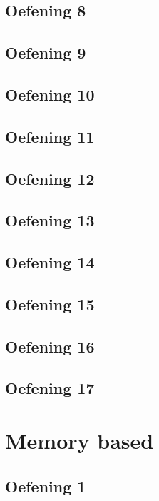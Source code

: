\documentclass[a4paper,11pt]{report}
\begin{document}
\section{Oefening 8}

\section{Oefening 9}

\section{Oefening 10}

\section{Oefening 11}

\section{Oefening 12}

\section{Oefening 13}

\section{Oefening 14}

\section{Oefening 15}

\section{Oefening 16}

\section{Oefening 17}


\newpage

\chapter{Memory based}
\section{Oefening 1}

\newpage
\end{document}
